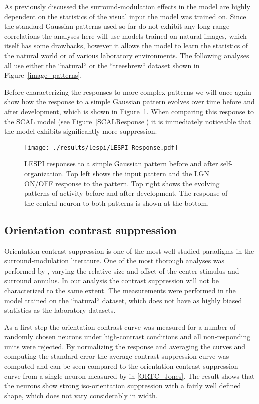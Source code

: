 As previously discussed the surround-modulation effects in the model
are highly dependent on the statistics of the visual input the model
was trained on. Since the standard Gaussian patterns used so far do
not exhibit any long-range correlations the analyses here will use
models trained on natural images, which itself has some drawbacks,
however it allows the model to learn the statistics of the natural
world or of various laboratory environments. The following analyses
all use either the ``natural`` or the ``treeshrew`` dataset shown in
Figure~\ref{image_patterns}.

Before characterizing the responses to more complex patterns we will
once again show how the response to a simple Gaussian pattern evolves
over time before and after development, which is shown in
Figure~\ref{LESPIResponse}. When comparing this response to the SCAL
model (see Figure~\ref{SCALResponse}) it is immediately noticeable
that the model exhibits significantly more suppression.

\begin{figure}
	\centering
    \texttt{[image: ./results/lespi/LESPI\_Response.pdf]}
	\caption[LEPSI responses to a simple Gaussian pattern before and
      after self-organization.]{LESPI responses to a simple Gaussian
      pattern before and after self-organization. Top left shows the
      input pattern and the LGN ON/OFF response to the pattern. Top
      right shows the evolving patterns of activity before and after
      development. The response of the central neuron to both patterns
      is shown at the bottom.}
	\label{LESPIResponse}
\end{figure}

\subsection{Orientation contrast suppression}

Orientation-contrast suppression is one of the most well-studied
paradigms in the surround-modulation literature. One of the most
thorough analyses was performed by \cite{Jones2002}, varying the
relative size and offset of the center stimulus and surround
annulus. In our analysis the contrast suppression will not be
characterized to the same extent. The measurements were performed in
the model trained on the ``natural`` dataset, which does not have as
highly biased statistics as the laboratory datasets.

As a first step the orientation-contrast curve was measured for a
number of randomly chosen neurons under high-contrast conditions and
all non-responding units were rejected. By normalizing the response
and averaging the curves and computing the standard error the average
contrast suppression curve was computed and can be seen compared to
the orientation-contrast suppression curve from a single neuron
measured by \cite{Jones2002} in \ref{ORTC_Jones}. The result shows
that the neurons show strong iso-orientation suppression with a fairly
well defined shape, which does not vary considerably in width.

